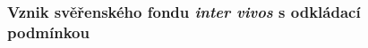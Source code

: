 \documentclass{article}
\begin{document}







\subsubsection[Vznik svěřenského fondu \textit{inter vivos} s odkládací podmínkou]{Vznik svěřenského fondu \textit{inter vivos} s odkládací\\ podmínkou}



\end{document}
